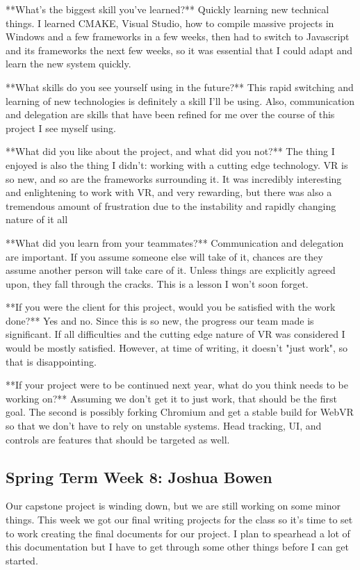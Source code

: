\documentclass[draftclsnofoot,onecolumn]{IEEEtran}
\begin{document}
**What's the biggest skill you've learned?**
Quickly learning new technical things. I learned CMAKE, Visual Studio, how to compile massive projects in Windows and a few frameworks in a few weeks, then had to switch to Javascript and its frameworks the next few weeks, so it was essential that I could adapt and learn the new system quickly. 

**What skills do you see yourself using in the future?**
This rapid switching and learning of new technologies is definitely a skill I'll be using. Also, communication and delegation are skills that have been refined for me over the course of this project I see myself using.

**What did you like about the project, and what did you not?**
The thing I enjoyed is also the thing I didn't: working with a cutting edge technology. VR is so new, and so are the frameworks surrounding it. It was incredibly interesting and enlightening to work with VR, and very rewarding, but there was also a tremendous amount of frustration due to the instability and rapidly changing nature of it all

**What did you learn from your teammates?**
Communication and delegation are important. If you assume someone else will take of it, chances are they assume another person will take care of it. Unless things are explicitly agreed upon, they fall through the cracks. This is a lesson I won't soon forget. 

**If you were the client for this project, would you be satisfied with the work done?**
Yes and no. Since this is so new, the progress our team made is significant. If all difficulties and the cutting edge nature of VR was considered I would be mostly satisfied. However, at time of writing, it doesn't "just work", so that is disappointing. 

**If your project were to be continued next year, what do you think needs to be working on?**
Assuming we don't get it to just work, that should be the first goal. The second is possibly forking Chromium and get a stable build for WebVR so that we don't have to rely on unstable systems. Head tracking, UI, and controls are features that should be targeted as well.

\subsection{Spring Term Week 8: Joshua Bowen}

Our capstone project is winding down, but we are still working on some minor things. This week we got our final writing projects for the class so it's time to set to work creating the final documents for our project. I plan to spearhead a lot of this documentation but I have to get through some other things before I can get started.
\end{document}
